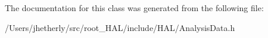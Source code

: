 The documentation for this class was generated from the following file\+:\begin{DoxyCompactItemize}
\item 
/\+Users/jhetherly/src/root\+\_\+\+H\+A\+L/include/\+H\+A\+L/Analysis\+Data.\+h\end{DoxyCompactItemize}
